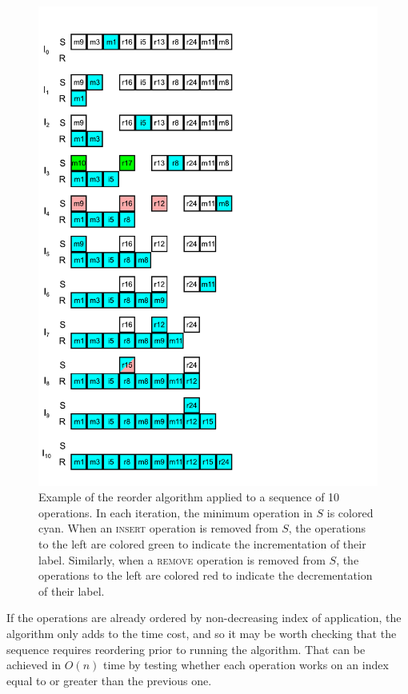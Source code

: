 \begin{figure}[!htp]
  \includegraphics[width=.9\textwidth]{figures/reorder_example.pdf}

  \caption{\small Example of the reorder algorithm applied to a sequence of 10
  operations. In each iteration, the minimum operation in $S$ is colored cyan.
  When an \textsc{insert} operation is removed from $S$, the operations to the
  left are colored green to indicate the incrementation of their label.
  Similarly, when a \textsc{remove} operation is removed from $S$, the
  operations to the left are colored red to indicate the decrementation of their
  label.}

  \label{fig:reorder-example}
\end{figure}

If the operations are already ordered by non-decreasing index of application,
the algorithm only adds to the time cost, and so it may be worth checking that
the sequence requires reordering prior to running the algorithm. That can be
achieved in $O(n)$ time by testing whether each operation works on an index
equal to or greater than the previous one.


